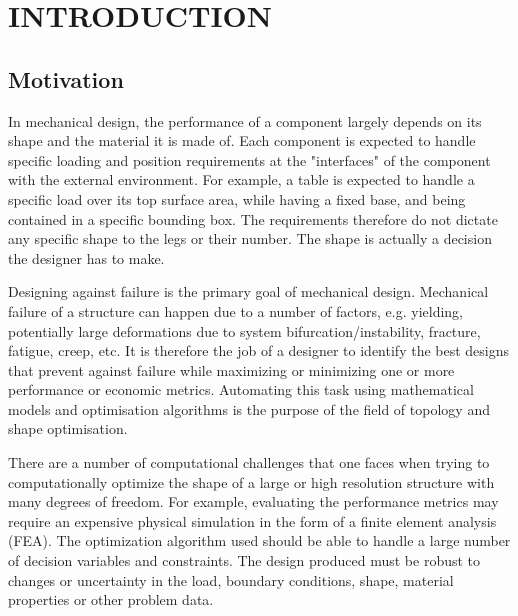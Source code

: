 \chapter{INTRODUCTION}\thispagestyle{EmptyHeader}
\label{chp:1}

\section{Motivation}

In mechanical design, the performance of a component largely depends on its shape and the material it is made of. Each component is expected to handle specific loading and position requirements at the "interfaces" of the component with the external environment. For example, a table is expected to handle a specific load over its top surface area, while having a fixed base, and being contained in a specific bounding box. The requirements therefore do not dictate any specific shape to the legs or their number. The shape is actually a decision the designer has to make.

Designing against failure is the primary goal of mechanical design. Mechanical failure of a structure can happen due to a number of factors, e.g. yielding, potentially large deformations due to system bifurcation/instability, fracture, fatigue, creep, etc. It is therefore the job of a designer to identify the best designs that prevent against failure while maximizing or minimizing one or more performance or economic metrics. Automating this task using mathematical models and optimisation algorithms is the purpose of the field of topology and shape optimisation.

There are a number of computational challenges that one faces when trying to computationally optimize the shape of a large or high resolution structure with many degrees of freedom. For example, evaluating the performance metrics may require an expensive physical simulation in the form of a finite element analysis (FEA). The optimization algorithm used should be able to handle a large number of decision variables and constraints. The design produced must be robust to changes or uncertainty in the load, boundary conditions, shape, material properties or other problem data.

